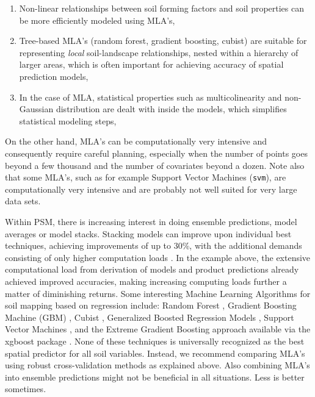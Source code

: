 \documentclass[graybox,natbib,nospthms,UStrade]{svmono}
\providecommand{\tightlist}{%
  \setlength{\itemsep}{0pt}\setlength{\parskip}{0pt}}
\providecommand{\tightlist}{\setlength{\itemsep}{0pt}\setlength{\parskip}{0pt}}
\begin{document}
\begin{enumerate}
\def\labelenumi{\arabic{enumi}.}
\tightlist
\item
  Non-linear relationships between soil forming factors and soil properties can be more efficiently modeled using MLA's,
\item
  Tree-based MLA's (random forest, gradient boosting, cubist) are suitable for representing \emph{local} soil-landscape relationships, nested within a hierarchy of larger areas, which is often important for achieving accuracy of spatial prediction models,
\item
  In the case of MLA, statistical properties such as multicolinearity and non-Gaussian distribution are dealt with inside the models, which simplifies statistical modeling steps,
\end{enumerate}

On the other hand, MLA's can be computationally very intensive and consequently require careful planning, especially when the number of points goes beyond a few thousand and the number of covariates beyond a dozen. Note also that some MLA's, such as for example Support Vector Machines (\texttt{svm}), are computationally very intensive and are probably not well suited for very large data sets.

Within PSM, there is increasing interest in doing ensemble predictions,
model averages or model stacks. Stacking models can improve upon
individual best techniques, achieving improvements of up to 30\%, with
the additional demands consisting of only higher computation loads
\citep{michailidis2017investigating}. In the example above, the extensive
computational load from derivation of models and product predictions
already achieved improved accuracies, making increasing computing loads
further a matter of diminishing returns. Some interesting Machine Learning Algorithms for soil mapping based on regression include: Random Forest \citep{Biau2016},
Gradient Boosting Machine (GBM) \citep{hastie2009elements}, Cubist \citep{kuhn2014cubist},
Generalized Boosted Regression Models \citep{ridgeway2010gbm}, Support Vector Machines \citep{chang2011libsvm},
and the Extreme Gradient Boosting approach available via the xgboost package \citep{2016arXiv160302754C}.
None of these techniques is universally recognized as the best spatial predictor for all soil variables.
Instead, we recommend comparing MLA's using robust cross-validation methods as explained above.
Also combining MLA's into ensemble predictions might not be beneficial in all situations.
Less is better sometimes.
\end{document}
